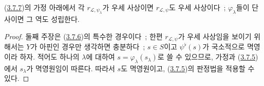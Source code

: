 \begin{corollary}[3.7.8]
\label{II.3.7.8-ko}
(\hyperref[II.3.7.7-ko]{3.7.7})의 가정 아래에서 각
$r_{\mathcal{L},\psi_\lambda}$가 우세 사상이면
$r_{\mathcal{L},\psi}$도 우세 사상이다~; $\varphi_\lambda$들이 단사이면
그 역도 성립한다.
\end{corollary}


\begin{proof}
둘째 주장은 (\hyperref[II.3.7.6-ko]{3.7.6})의 특수한 경우이다~; 한편
$r_{\mathcal{L},\psi}$가 우세 사상임을 보이기 위해서는 $Y$가 아핀인
경우만 생각하면 충분하다~; $s\in S$이고 $\psi^\flat(s)$가 국소적으로
멱영이라 하자. 적어도 하나의 $\lambda$에 대하여
$s=\varphi_\lambda(s_\lambda)$로 쓸 수 있으므로, 가정과
(\hyperref[II.3.7.5-ko]{3.7.5})에서 $s_\lambda$가 멱영원임이 따른다.
따라서 $s$도 멱영원이고, (\hyperref[II.3.7.5-ko]{3.7.5})의 판정법을
적용할 수 있다.
\end{proof}

